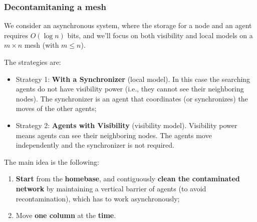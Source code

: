 \subsubsection{Decontamitaning a mesh}
We consider an asynchronous system, where the storage for a node and an agent requires $O(\log n)$ bits, and we'll focus on both visibility and local models on a $m \times n$ mesh (with $m \leq n$).

The strategies are:
\begin{itemize}
    \item Strategy 1: \textbf{With a Synchronizer} (local model). In this case the searching agents do not have visibility power (i.e., they cannot see their neighboring nodes). The synchronizer is an agent that coordinates (or synchronizes) the moves of the other agents;
    \item Strategy 2: \textbf{Agents with Visibility} (visibility model). Visibility power means agents can see their neighboring nodes. The agents move independently and the synchronizer is not required.
\end{itemize}

The main idea is the following:
\begin{enumerate}
    \item \textbf{Start} from the \textbf{homebase}, and contiguously \textbf{clean the contaminated network} by maintaining a vertical barrier of agents (to avoid recontamination), which has to work asynchronously;
    \item Move \textbf{one column} at the \textbf{time}.
\end{enumerate}


